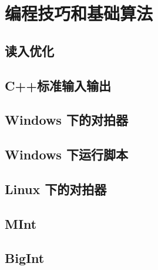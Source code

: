 \chapter{编程技巧和基础算法}

\section{读入优化}


\section{C++标准输入输出}
















\section{Windows 下的对拍器}


\section{Windows 下运行脚本}


\section{Linux 下的对拍器}



\section{MInt}


\section{BigInt}

